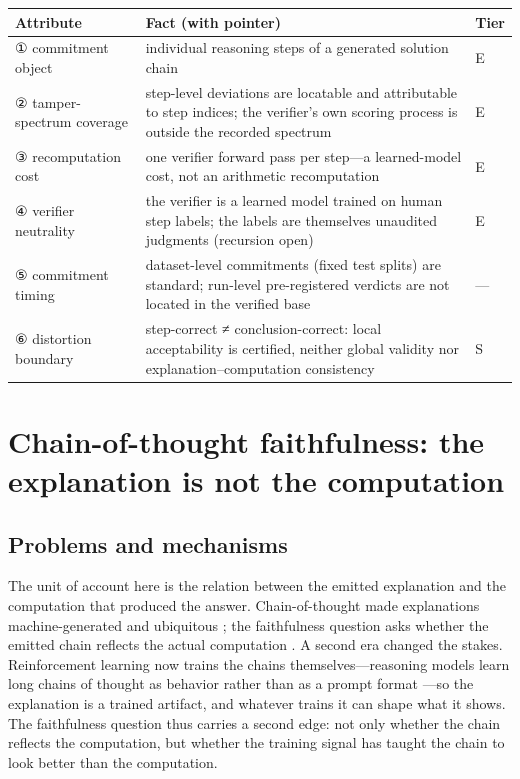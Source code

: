 \documentclass[11pt,a4paper]{article}
\begin{document}
\begin{table}[htbp]
\centering
\footnotesize
\setlength{\tabcolsep}{3.5pt}
\renewcommand{\arraystretch}{1.18}
\begin{tabularx}{0.985\textwidth}{>{\raggedright\arraybackslash}p{} >{\raggedright\arraybackslash}X >{\raggedright\arraybackslash}p{}}
\toprule
\textbf{Attribute} & \textbf{Fact (with pointer)} & \textbf{Tier} \\
\midrule
① commitment object & individual reasoning steps of a generated solution chain \cite{key05,key06} & E \\
② tamper-spectrum coverage & step-level deviations are locatable and attributable to step indices; the verifier's own scoring process is outside the recorded spectrum \cite{key05,key06} & E \\
③ recomputation cost & one verifier forward pass per step—a learned-model cost, not an arithmetic recomputation \cite{key06} & E \\
④ verifier neutrality & the verifier is a learned model trained on human step labels; the labels are themselves unaudited judgments (recursion open) \cite{key06} & E \\
⑤ commitment timing & dataset-level commitments (fixed test splits) are standard; run-level pre-registered verdicts are not located in the verified base & — \\
⑥ distortion boundary & step-correct ≠ conclusion-correct: local acceptability is certified, neither global validity nor explanation–computation consistency & S \\
\bottomrule
\end{tabularx}
\end{table}

\section{Chain-of-thought faithfulness: the explanation is not the computation}

\subsection{Problems and mechanisms}

The unit of account here is the relation between the emitted explanation and the computation that produced the answer. Chain-of-thought made explanations machine-generated and ubiquitous \cite{key01}; the faithfulness question asks whether the emitted chain reflects the actual computation \cite{key02,key03}. A second era changed the stakes. Reinforcement learning now trains the chains themselves—reasoning models learn long chains of thought as behavior rather than as a prompt format \cite{key29}—so the explanation is a trained artifact, and whatever trains it can shape what it shows. The faithfulness question thus carries a second edge: not only whether the chain reflects the computation, but whether the training signal has taught the chain to look better than the computation.
\end{document}
